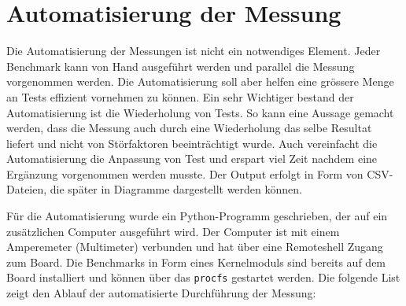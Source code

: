 \section{Automatisierung der Messung}

Die Automatisierung der Messungen ist nicht ein notwendiges Element. Jeder Benchmark kann von Hand ausgeführt werden und parallel die Messung vorgenommen werden. Die Automatisierung soll aber helfen eine grössere Menge an Tests effizient vornehmen zu können. Ein sehr Wichtiger bestand der Automatisierung ist die Wiederholung von Tests. So kann eine Aussage gemacht werden, dass die Messung auch durch eine Wiederholung das selbe Resultat liefert und nicht von Störfaktoren beeinträchtigt wurde. Auch vereinfacht die Automatisierung die Anpassung von Test und erspart viel Zeit nachdem eine Ergänzung vorgenommen werden musste. Der Output erfolgt in Form von CSV-Dateien, die später in Diagramme dargestellt werden können.
\par
Für die Automatisierung wurde ein Python-Programm geschrieben, der auf ein zusätzlichen Computer ausgeführt wird. Der Computer ist mit einem Amperemeter (Multimeter) verbunden und hat über eine Remoteshell Zugang zum Board. Die Benchmarks in Form eines Kernelmoduls sind bereits auf dem Board installiert und können über das \texttt{procfs} gestartet werden. Die folgende List zeigt den Ablauf der automatisierte Durchführung der Messung:


